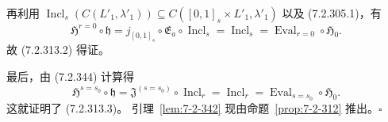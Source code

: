 再利用
$\operatorname{Incl}_s(C(L'_1,\lambda'_1))
\subseteq C([0,1]_s\times L'_1,\lambda'_1)$
以及 (7.2.305.1)，有
\[
\mathfrak H^{r=0}\circ\mathfrak h
=j_{[0,1]_s}\circ\mathfrak E_a
\circ\operatorname{Incl}_s
=\operatorname{Incl}_s
=\operatorname{Eval}_{r=0}
\circ\mathfrak H_0.
\]
故 (7.2.313.2) 得证。

最后，由 (7.2.344) 计算得
\[
\mathfrak H^{s=s_0}\circ\mathfrak h
=\mathfrak J^{(s=s_0)}
\circ\operatorname{Incl}_r
=\operatorname{Incl}_r
=\operatorname{Eval}_{s=s_0}
\circ\mathfrak H_0.
\]
这就证明了 (7.2.313.3)。
引理~\ref{lem:7-2-342}
现由命题~\ref{prop:7-2-312}
推出。\hfill$\square$
